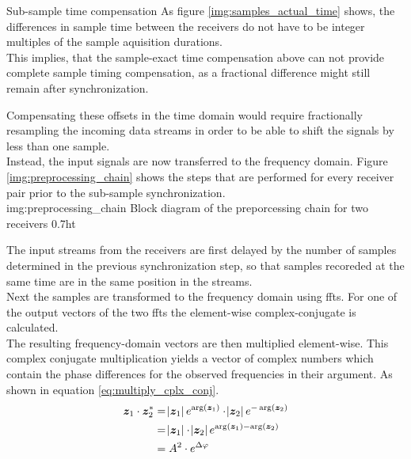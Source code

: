 \begin{subchapter}{Sub-sample time compensation}
  As figure \ref{img:samples_actual_time} shows, the
  differences in sample time between the receivers do not
  have to be integer multiples of the sample aquisition durations. \\

  This implies, that the sample-exact time compensation above
  can not provide complete sample timing compensation, as
  a fractional difference might still remain after synchronization.

  Compensating these offsets in the time domain would
  require fractionally resampling the incoming data streams
  in order to be able to shift the signals by less than
  one sample. \\

  Instead, the input signals are now transferred to the
  frequency domain. Figure \ref{img:preprocessing_chain}
  shows the steps that are performed for every receiver pair prior to
  the sub-sample synchronization. \\

               {img:preprocessing_chain}
               {Block diagram of the preporcessing chain for two receivers}
               {0.7}{ht}

  The input streams from the receivers are first delayed
  by the number of samples determined in the previous
  synchronization step, so that samples recoreded at the
  same time are in the same position in the streams. \\

  Next the samples are transformed to the frequency domain
  using \glspl{fft}.
  For one of the output vectors of the two \glspl{fft} the
  element-wise complex-conjugate is calculated. \\

  The resulting frequency-domain vectors are then
  multiplied element-wise. This complex conjugate multiplication
  yields a vector of complex numbers which contain the
  phase differences for the observed frequencies in
  their argument. As shown in equation
  \ref{eq:multiply_cplx_conj}. \\

  \begin{equation}
    \label{eq:multiply_cplx_conj}
    \begin{split}
      \bm{z}_\text{1} \cdot \bm{z}_\text{2}^{\ast}
      & = \abs{\bm{z}_\text{1}} e^{\arg(\bm{z}_\text{1})}
        \cdot
        \abs{\bm{z}_\text{2}} e^{-\arg(\bm{z}_\text{2})} \\
      & = \abs{\bm{z}_\text{1}} \cdot \abs{\bm{z}_\text{2}}
        e^{\arg(\bm{z}_\text{1}) - \arg(\bm{z}_\text{2})} \\
      & = A^{2} \cdot e^{\Delta \varphi}
    \end{split}
  \end{equation}


\end{subchapter}
